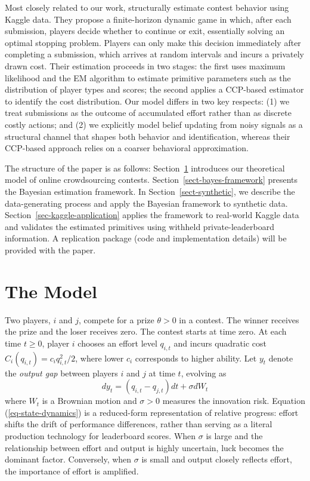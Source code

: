 \documentclass[mnsc]{informs3}
\begin{document}
Most closely related to our work, \citet{lemus2021dynamic} structurally estimate contest behavior using Kaggle data.
They propose a finite-horizon dynamic game in which, after each submission, players decide whether to continue or exit, essentially solving an optimal stopping problem.
Players can only make this decision immediately after completing a submission, which arrives at random intervals and incurs a privately drawn cost.
Their estimation proceeds in two stages: the first uses maximum likelihood and the EM algorithm to estimate primitive parameters such as the distribution of player types and scores; the second applies a CCP-based estimator to identify the cost distribution.
Our model differs in two key respects:
(1) we treat submissions as the outcome of accumulated effort rather than as discrete costly actions; and
(2) we explicitly model belief updating from noisy signals as a structural channel that shapes both behavior and identification, whereas their CCP-based approach relies on a coarser behavioral approximation.







The structure of the paper is as follows:
Section~\ref{contest-theory} introduces our theoretical model of online crowdsourcing contests.
Section~\ref{sect-bayes-framework} presents the Bayesian estimation framework.
In Section~\ref{sect-synthetic}, we describe the data-generating process and apply the Bayesian framework to synthetic data.
Section~\ref{sec-kaggle-application} applies the framework to real-world Kaggle data and validates the estimated primitives using withheld private-leaderboard information.
A replication package (code and implementation details) will be provided with the paper.



\section{The Model}\label{contest-theory}

Two players, $i$ and $j$, compete for a prize $\theta>0$ in a contest.
The winner receives the prize and the loser receives zero.
The contest starts at time zero.
At each time $t\ge0$, player $i$ chooses an effort level $q_{i,t}$ and incurs quadratic cost $C_i(q_{i,t}) = c_i q_{i,t}^2/2$, where lower $c_i$ corresponds to higher ability.
Let $y_t$ denote the \textit{output gap} between players $i$ and $j$ at time $t$, evolving as
\begin{equation}\label{eq-state-dynamics}
	dy_t = (q_{i,t}-q_{j,t})dt + \sigma dW_t
\end{equation}
where $W_t$ is a Brownian motion and $\sigma>0$ measures the innovation risk.
Equation (\ref{eq-state-dynamics}) is a reduced-form representation of relative progress: effort shifts the drift of performance differences, rather than serving as a literal production technology for leaderboard scores.
When $\sigma$ is large and the relationship between effort and output is highly uncertain, luck becomes the dominant factor.
Conversely, when $\sigma$ is small and output closely reflects effort, the importance of effort is amplified.
\end{document}
